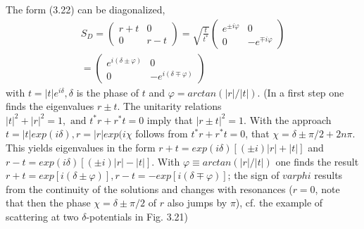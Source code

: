 The form (3.22) can be diagonalized, 
\begin{equation}
\begin{aligned} S_{D}=\left(\begin{array}{cc}{r+t} & {0} \\ {0} & {r-t}\end{array}\right)=\sqrt{\frac{t}{t^{*}}}\left(\begin{array}{cc}{e^{\pm i \varphi}} & {0} \\ {0} & {-e^{\mp i \varphi}}\end{array}\right) \\=\left(\begin{array}{cc}{e^{i(\delta \pm \varphi)}} & {0} \\ {0} & {-e^{i(\delta \mp \varphi)}}\end{array}\right) \end{aligned}
\end{equation}
with $t = |t|e^{i\delta},\delta$ is the phase of $t$ and $\varphi = arctan (| r | / | t |)$. (In a first step one finds the eigenvalues $​​r \pm t$. The unitarity relations $|t|^2+|r|^2=1, \text{ and } t^*r+r^*t=0$ imply that $| r \pm t |^2 = 1$. With the approach $t = | t | exp (i\delta), r = | r | exp (i\chi$ follows from $t^*r+r^*t = 0$, that $\chi = \delta \pm \pi / 2 + 2n\pi$. This yields eigenvalues ​​in the form $r + t = exp (i\delta) [(\pm i) | r | + | t |]$ and $r - t = exp (i\delta) [(\pm i) | r | - | t |]$. With $\varphi \equiv arctan (| r | / | t |)$ one finds the result $r + t = exp [i (\delta \pm \varphi)], r -t = - exp [i (\delta\mp\varphi)]$; the sign of $varphi$ results from the continuity of the solutions and changes with resonances ($r = 0$, note that then the phase $\chi = \delta \pm \pi / 2$ of $r$ also jumps by $\pi$), cf. the example of scattering at two $\delta$-potentials in Fig. 3.21)

